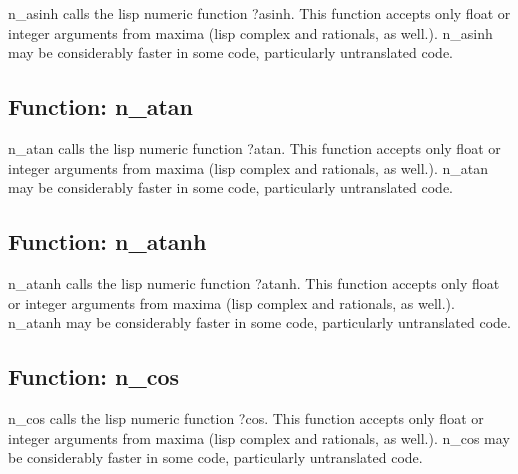 \documentclass[]{article}
\begin{document}
\vspace{5 pt}
n\_asinh calls the lisp numeric function ?asinh. This function accepts only float or integer arguments from maxima (lisp complex and rationals, as well.). n\_asinh may be considerably faster in some code, particularly untranslated code. 

\vspace{5 pt}


\subsection{Function: n\_atan\label{sec:n_atan}}
\hypertarget{n_atan}{}



\vspace{5 pt}
n\_atan calls the lisp numeric function ?atan. This function accepts only float or integer arguments from maxima (lisp complex and rationals, as well.). n\_atan may be considerably faster in some code, particularly untranslated code. 

\vspace{5 pt}


\subsection{Function: n\_atanh\label{sec:n_atanh}}
\hypertarget{n_atanh}{}



\vspace{5 pt}
n\_atanh calls the lisp numeric function ?atanh. This function accepts only float or integer arguments from maxima (lisp complex and rationals, as well.). n\_atanh may be considerably faster in some code, particularly untranslated code. 

\vspace{5 pt}


\subsection{Function: n\_cos\label{sec:n_cos}}
\hypertarget{n_cos}{}



\vspace{5 pt}
n\_cos calls the lisp numeric function ?cos. This function accepts only float or integer arguments from maxima (lisp complex and rationals, as well.). n\_cos may be considerably faster in some code, particularly untranslated code. 
\end{document}

